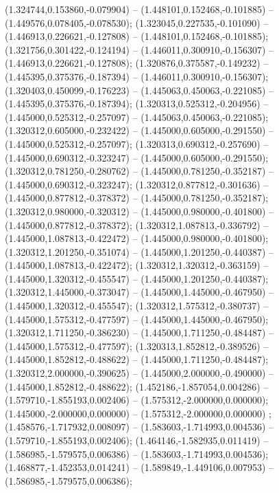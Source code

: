  (1.324744,0.153860,-0.079904) -- (1.448101,0.152468,-0.101885) -- (1.449576,0.078405,-0.078530);
 (1.323045,0.227535,-0.101090) -- (1.446913,0.226621,-0.127808) -- (1.448101,0.152468,-0.101885);
 (1.321756,0.301422,-0.124194) -- (1.446011,0.300910,-0.156307) -- (1.446913,0.226621,-0.127808);
 (1.320876,0.375587,-0.149232) -- (1.445395,0.375376,-0.187394) -- (1.446011,0.300910,-0.156307);
 (1.320403,0.450099,-0.176223) -- (1.445063,0.450063,-0.221085) -- (1.445395,0.375376,-0.187394);
 (1.320313,0.525312,-0.204956) -- (1.445000,0.525312,-0.257097) -- (1.445063,0.450063,-0.221085);
 (1.320312,0.605000,-0.232422) -- (1.445000,0.605000,-0.291550) -- (1.445000,0.525312,-0.257097);
 (1.320313,0.690312,-0.257690) -- (1.445000,0.690312,-0.323247) -- (1.445000,0.605000,-0.291550);
 (1.320312,0.781250,-0.280762) -- (1.445000,0.781250,-0.352187) -- (1.445000,0.690312,-0.323247);
 (1.320312,0.877812,-0.301636) -- (1.445000,0.877812,-0.378372) -- (1.445000,0.781250,-0.352187);
 (1.320312,0.980000,-0.320312) -- (1.445000,0.980000,-0.401800) -- (1.445000,0.877812,-0.378372);
 (1.320312,1.087813,-0.336792) -- (1.445000,1.087813,-0.422472) -- (1.445000,0.980000,-0.401800);
 (1.320312,1.201250,-0.351074) -- (1.445000,1.201250,-0.440387) -- (1.445000,1.087813,-0.422472);
 (1.320312,1.320312,-0.363159) -- (1.445000,1.320312,-0.455547) -- (1.445000,1.201250,-0.440387);
 (1.320312,1.445000,-0.373047) -- (1.445000,1.445000,-0.467950) -- (1.445000,1.320312,-0.455547);
 (1.320312,1.575312,-0.380737) -- (1.445000,1.575312,-0.477597) -- (1.445000,1.445000,-0.467950);
 (1.320312,1.711250,-0.386230) -- (1.445000,1.711250,-0.484487) -- (1.445000,1.575312,-0.477597);
 (1.320313,1.852812,-0.389526) -- (1.445000,1.852812,-0.488622) -- (1.445000,1.711250,-0.484487);
 (1.320312,2.000000,-0.390625) -- (1.445000,2.000000,-0.490000) -- (1.445000,1.852812,-0.488622);
 (1.452186,-1.857054,0.004286) -- (1.579710,-1.855193,0.002406) -- (1.575312,-2.000000,0.000000);
 (1.445000,-2.000000,0.000000) -- (1.575312,-2.000000,0.000000) ;
 (1.458576,-1.717932,0.008097) -- (1.583603,-1.714993,0.004536) -- (1.579710,-1.855193,0.002406);
 (1.464146,-1.582935,0.011419) -- (1.586985,-1.579575,0.006386) -- (1.583603,-1.714993,0.004536);
 (1.468877,-1.452353,0.014241) -- (1.589849,-1.449106,0.007953) -- (1.586985,-1.579575,0.006386);
